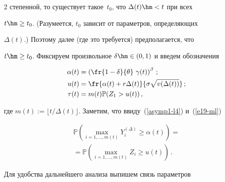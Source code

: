 \begin{multicols}{2}
степенной, то существует   такое~$t_0$, что $\Delta(t)\hm<t$ при всех


$t\hm\ge t_0$. (Разумеется, $t_0$ зависит от параметров, определяющих


$\Delta(t)$.) Поэтому далее (где это требуется) предполагается, что


$t\hm\ge t_0$.  Фиксируем произвольное $\delta \hm\in (0,1)$ и введем обозначения





\vspace*{-2pt}





\noindent


\begin{align*}


\alpha(t)&=\left( \fr{1-\delta}{\theta}\,\,\gamma (t) \right)^\beta\,;\\


u(t)&= \fr{ \alpha(t)+r\Delta(t)}{\sigma\sqrt{v(\Delta(t))}}\,;\\


\tau(t)&= m(t)\mathbb{P}(Z_1>u(t))\,,


\end{align*}


где $m(t):=\lfloor t/\Delta(t)\rfloor$. Заметим, что ввиду~(\ref{asymp1-l4}) и~(\ref{e19-ml})





\vspace*{-2pt}





\noindent


\begin{multline}


\mathbb{P} \left( \max\limits_{i=1,\ldots, m(t)} Y_i^{(\Delta)} \geq \alpha(t)


\right) = {}\\


{}=\mathbb{P} \left( \max\limits_{i=1,\ldots ,m(t)} Z_i \geq u(t)


\right)\,.


\label{e27-ml}


\end{multline}


Для удобства дальнейшего анализа выпишем связь параметров


\begin{equation*}



\end{equation*}
\end{multicols}
